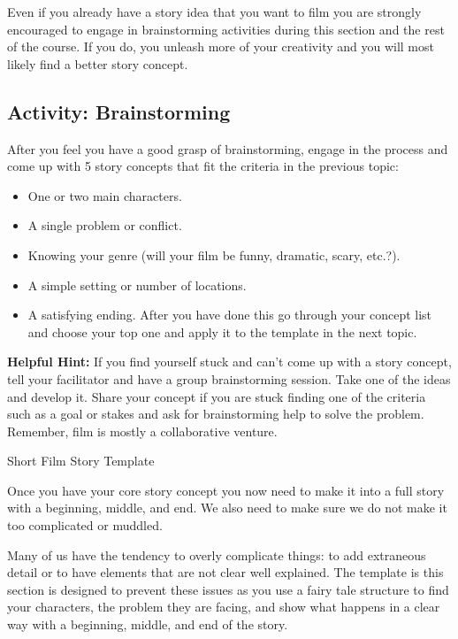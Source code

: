 \documentclass[
]{book}
\providecommand{\tightlist}{%
  \setlength{\itemsep}{0pt}\setlength{\parskip}{0pt}}
\begin{document}
Even if you already have a story idea that you want to film you are strongly encouraged to engage in brainstorming activities during this section and the rest of the course. If you do, you unleash more of your creativity and you will most likely find a better story concept.

\hypertarget{activity-brainstorming}{%
\subsection*{Activity: Brainstorming}\label{activity-brainstorming}}

\begin{reflect}
After you feel you have a good grasp of brainstorming, engage in the process and come up with 5 story concepts that fit the criteria in the previous topic:

\begin{itemize}
\tightlist
\item
  One or two main characters.
\item
  A single problem or conflict.
\item
  Knowing your genre (will your film be funny, dramatic, scary, etc.?).
\item
  A simple setting or number of locations.
\item
  A satisfying ending. After you have done this go through your concept list and choose your top one and apply it to the template in the next topic.
\end{itemize}

\textbf{Helpful Hint:} If you find yourself stuck and can't come up with a story concept, tell your facilitator and have a group brainstorming session. Take one of the ideas and develop it. Share your concept if you are stuck finding one of the criteria such as a goal or stakes and ask for brainstorming help to solve the problem. Remember, film is mostly a collaborative venture.
\end{reflect}

{Short Film Story Template}

Once you have your core story concept you now need to make it into a full story with a beginning, middle, and end. We also need to make sure we do not make it too complicated or muddled.

Many of us have the tendency to overly complicate things: to add extraneous detail or to have elements that are not clear well explained. The template is this section is designed to prevent these issues as you use a fairy tale structure to find your characters, the problem they are facing, and show what happens in a clear way with a beginning, middle, and end of the story.
\end{document}

